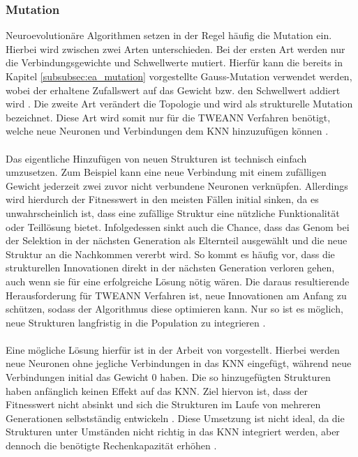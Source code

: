 \subsubsection{Mutation}
Neuroevolutionäre Algorithmen setzen in der Regel häufig die Mutation ein. Hierbei wird zwischen zwei Arten unterschieden. Bei der ersten Art werden nur die Verbindungsgewichte und Schwellwerte mutiert. Hierfür kann die bereits in Kapitel \ref{subsubsec:ea_mutation} vorgestellte Gauss-Mutation verwendet werden, wobei der erhaltene Zufallswert auf das Gewicht bzw. den Schwellwert addiert wird \cite{mcintyre_neatpython}. Die zweite Art verändert die Topologie und wird als strukturelle Mutation bezeichnet. Diese Art wird somit nur für die \ac{TWEANN} Verfahren benötigt, welche neue Neuronen und Verbindungen dem \ac{KNN} hinzuzufügen können \cite{stanley2002evolving}.
\\\\
Das eigentliche Hinzufügen von neuen Strukturen ist technisch einfach umzusetzen. Zum Beispiel kann eine neue Verbindung mit einem zufälligen Gewicht jederzeit zwei zuvor nicht verbundene Neuronen verknüpfen. Allerdings wird hierdurch der Fitnesswert in den meisten Fällen initial sinken, da es unwahrscheinlich ist, dass eine zufällige Struktur eine nützliche Funktionalität oder Teillösung bietet. Infolgedessen sinkt auch die Chance, dass das Genom bei der Selektion in der nächsten Generation als Elternteil ausgewählt und die neue Struktur an die Nachkommen vererbt wird. So kommt es häufig vor, dass die strukturellen Innovationen direkt in der nächsten Generation verloren gehen, auch wenn sie für eine erfolgreiche Lösung nötig wären. Die daraus resultierende Herausforderung für \ac{TWEANN} Verfahren ist, neue Innovationen am Anfang zu schützen, sodass der Algorithmus diese optimieren kann. Nur so ist es möglich, neue Strukturen langfristig in die Population zu integrieren \cite{stanley2002evolving}.
\\\\
Eine mögliche Lösung hierfür ist in der Arbeit von \citeauthor{angeline1994gnarl} vorgestellt. Hierbei werden neue Neuronen ohne jegliche Verbindungen in das \ac{KNN} eingefügt, während neue Verbindungen initial das Gewicht $0$ haben. Die so hinzugefügten Strukturen haben anfänglich keinen Effekt auf das \ac{KNN}. Ziel hiervon ist, dass der Fitnesswert nicht absinkt und sich die Strukturen im Laufe von mehreren Generationen selbstständig entwickeln \cite{angeline1994gnarl}. Diese Umsetzung ist nicht ideal, da die Strukturen unter Umständen nicht richtig in das \ac{KNN} integriert werden, aber dennoch die benötigte Rechenkapazität erhöhen \cite{stanley2002evolving}.
